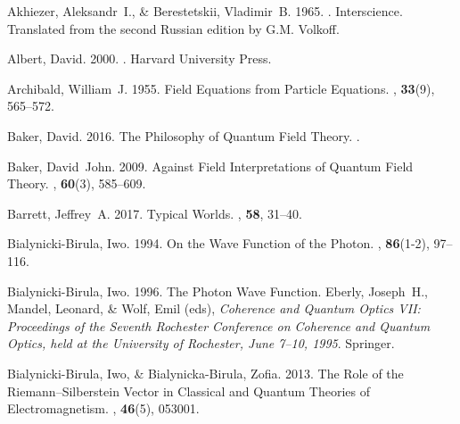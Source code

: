 \documentclass[12pt,secnumarabic,amsmath,amssymb,balancelastpage,nofootinbib]{article}
\begin{document}
\begin{thebibliography}{}

Akhiezer, Aleksandr~I., \& Berestetskii, Vladimir~B. 1965.
.
\newblock Interscience.
\newblock Translated from the second Russian edition by G.M. Volkoff.

Albert, David. 2000.
.
\newblock Harvard University Press.

Archibald, William~J. 1955.
\newblock Field Equations from Particle Equations.
, {\bf 33}(9), 565--572.

Baker, David. 2016.
\newblock The Philosophy of Quantum Field Theory.
.

Baker, David~John. 2009.
\newblock Against Field Interpretations of Quantum Field Theory.
, {\bf 60}(3),
  585--609.

Barrett, Jeffrey~A. 2017.
\newblock Typical Worlds.
, {\bf 58},
  31--40.

Bialynicki-Birula, Iwo. 1994.
\newblock On the Wave Function of the Photon.
, {\bf 86}(1-2), 97--116.

Bialynicki-Birula, Iwo. 1996.
\newblock The Photon Wave Function.
 Eberly, Joseph~H., Mandel, Leonard, \&
  Wolf, Emil (eds), {\em Coherence and Quantum Optics VII: Proceedings of the
  Seventh Rochester Conference on Coherence and Quantum Optics, held at the
  University of Rochester, June 7--10, 1995}.
\newblock Springer.

Bialynicki-Birula, Iwo, \& Bialynicka-Birula, Zofia. 2013.
\newblock The Role of the Riemann--Silberstein Vector in Classical and Quantum
  Theories of Electromagnetism.
, {\bf
  46}(5), 053001.


\end{thebibliography}
\end{document}
